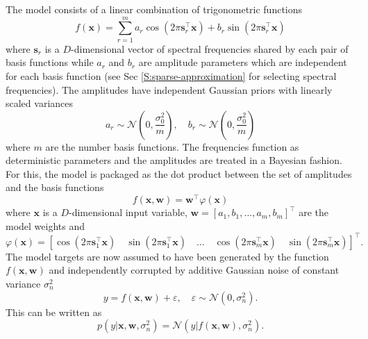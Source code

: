 The model consists of a linear combination of trigonometric functions \cite{quia2010sparse}
\begin{equation}
    f(\mathbf{x})=\sum_{r=1}^{m} a_{r} \cos \left(2 \pi \mathbf{s}_{r}^{\top} \mathbf{x}\right)+b_{r} \sin \left(2 \pi \mathbf{s}_{r}^{\top} \mathbf{x}\right)
    \label{Eq:Model-trigonometric-model}
\end{equation}
where $\mathbf{s}_{r}$ is a $D$-dimensional vector of spectral frequencies shared by each pair of basis functions while $a_{r}$ and $b_{r}$ are amplitude parameters which are independent for each basis function (see Sec \ref{S:sparse-approximation} for selecting spectral frequencies). The amplitudes have independent Gaussian priors with linearly scaled variances 
\begin{equation}
    a_{r} \sim \mathcal{N}\left(0, \frac{\sigma_{0}^{2}}{m}\right), \quad b_{r} \sim \mathcal{N}\left(0, \frac{\sigma_{0}^{2}}{m}\right)
\end{equation}
where $m$ are the number basis functions. The frequencies function as deterministic parameters and the amplitudes are treated in a Bayesian fashion. For this, the model is packaged as the dot product between the set of amplitudes and the basis functions 
\begin{equation}
    f(\mathbf{x}, \mathbf{w}) = \mathbf{w}^{\top} \varphi\left(\mathbf{x}\right)
\end{equation}
where $\mathbf{x}$ is a $D$-dimensional input variable, $\mathbf{w}=\left[a_{1}, b_{1}, \dots, a_{m}, b_{m}\right]^{\top}$ are the model weights and
\begin{equation}
    \varphi(\mathbf{x})=\left[\cos \left(2 \pi \mathbf{s}_{1}^{\top} \mathbf{x}\right)\quad \sin \left(2 \pi \mathbf{s}_{1}^{\top} \mathbf{x}\right) \quad\ldots\quad \cos \left(2 \pi \mathbf{s}_{m}^{\top} \mathbf{x}\right) \quad \sin \left(2 \pi \mathbf{s}_{m}^{\top} \mathbf{x}\right)\right]^{\top}.
\end{equation}
The model targets are now assumed to have been generated by the function $f(\mathbf{x}, \mathbf{w})$ and independently corrupted by additive Gaussian noise of constant variance $\sigma_{n}^{2}$
\begin{equation}
    y = f(\mathbf{x}, \mathbf{w}) + \varepsilon, \quad \varepsilon \sim \mathcal{N}\left(0,\sigma_{n}^{2}\right).
\end{equation}
This can be written as 
\begin{equation}
    p(y | \mathbf{x}, \mathbf{w}, \sigma^{2}_{n})= \mathcal{N}\left(y | f(\mathbf{x}, \mathbf{w}), \sigma^{2}_{n}\right).
    \label{Eq:Model-one-value-likelihood}
\end{equation}
